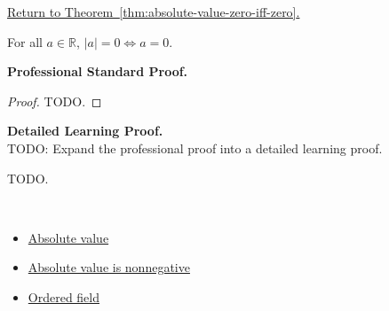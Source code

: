 \newpage
{}
\label{prf:absolute-value-zero-iff-zero}

\begin{remark*}[Return]
\hyperref[thm:absolute-value-zero-iff-zero]{Return to Theorem~\ref*{thm:absolute-value-zero-iff-zero}.}
\end{remark*}

\begin{theorem*}
For all $a \in \mathbb{R}$, $\lvert a \rvert = 0 \iff a = 0$.
\end{theorem*}

\textbf{Professional Standard Proof.}~\\
\begin{proof}
TODO.
\end{proof}

\textbf{Detailed Learning Proof.}~\\
TODO: Expand the professional proof into a detailed learning proof.


\begin{remark*}
TODO.
\end{remark*}

\begin{remark*}[Dependencies]~\\
\begin{itemize}
  \item \hyperref[def:absolute-value]{Absolute value}
  \item \hyperref[thm:absolute-value-nonneg]{Absolute value is nonnegative}
  \item \hyperref[def:ordered-field]{Ordered field}
\end{itemize}
\end{remark*}

